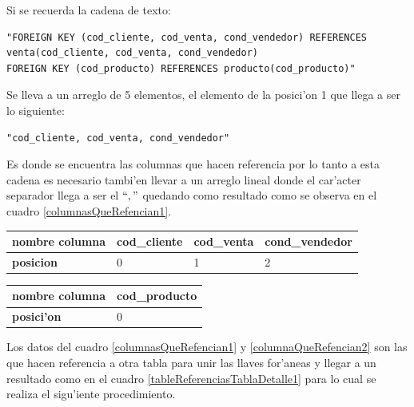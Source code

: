 Si se recuerda la cadena de texto: 
\lstset{language=sql,breaklines=true}
\begin{lstlisting}
"FOREIGN KEY (cod_cliente, cod_venta, cond_vendedor) REFERENCES venta(cod_cliente, cod_venta, cond_vendedor)
FOREIGN KEY (cod_producto) REFERENCES producto(cod_producto)"
\end{lstlisting}
Se lleva a un arreglo de 5 elementos, el elemento de la posici'on 1 que llega a ser lo siguiente:
\lstset{language=sql,breaklines=true}
\begin{lstlisting}
"cod_cliente, cod_venta, cond_vendedor"
\end{lstlisting}
Es donde se encuentra las columnas que hacen referencia por lo tanto a esta cadena es necesario tambi'en llevar a un arreglo lineal donde el car'acter separador llega a ser el $`` , " $  quedando como resultado como se observa en el cuadro \ref{columnasQueRefencian1}.
\begin{center}
\scriptsize
\renewcommand{\arrayrulewidth}{1pt}
  \label{columnasQueRefencian1} %
  \begin{tabular}{|l|l|l|l|}
\hline
\textbf{nombre columna} & cod\_cliente & cod\_venta & cond\_vendedor \\ \hline
\textbf{posicion}       & 0            & 1          & 2              \\ \hline
\end{tabular}
\end{center}


\begin{center}
\scriptsize
\renewcommand{\arrayrulewidth}{1pt}
  \label{columnaQueRefencian2} %
  \begin{tabular}{|l|l|}
\hline
\textbf{nombre columna} & cod\_producto \\ \hline
\textbf{posici'on}      & 0             \\ \hline
\end{tabular}
\end{center}

Los datos del cuadro \ref{columnasQueRefencian1} y \ref{columnaQueRefencian2} son las que hacen referencia a otra tabla para unir las llaves for'aneas y llegar a un resultado como en el cuadro \ref{tableReferenciasTablaDetalle1} para lo cual se realiza el sigu'iente procedimiento.


